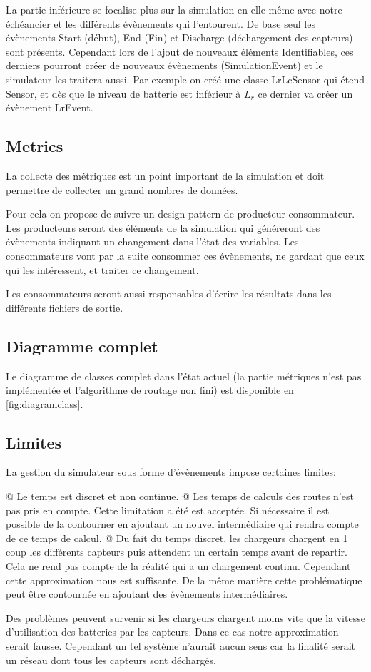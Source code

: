 \documentclass[final]{polytech/polytech}
\begin{document}
			La partie inférieure se focalise plus sur la simulation en elle même avec notre échéancier et les différents évènements qui l'entourent.
			De base seul les évènements Start (début), End (Fin) et Discharge (déchargement des capteurs) sont présents.
			Cependant lors de l'ajout de nouveaux éléments Identifiables, ces derniers pourront créer de nouveaux évènements (SimulationEvent) et le simulateur les traitera aussi.
			Par exemple on créé une classe LrLcSensor qui étend Sensor, et dès que le niveau de batterie est inférieur à $L_r$ ce dernier va créer un évènement LrEvent.
		
		\subsection{Metrics}
			La collecte des métriques est un point important de la simulation et doit permettre de collecter un grand nombres de données.
			
			Pour cela on propose de suivre un design pattern de producteur consommateur.
			Les producteurs seront des éléments de la simulation qui généreront des évènements indiquant un changement dans l'état des variables.
			Les consommateurs vont par la suite consommer ces évènements, ne gardant que ceux qui les intéressent, et traiter ce changement.
			
			Les consommateurs seront aussi responsables d'écrire les résultats dans les différents fichiers de sortie.
			
		\subsection{Diagramme complet}
			Le diagramme de classes complet dans l'état actuel (la partie métriques n'est pas implémentée et l'algorithme de routage non fini) est disponible en \autoref{fig:diagramclass}.
			
		\subsection{Limites}
			La gestion du simulateur sous forme d'évènements impose certaines limites:
			\begin{easylist}[itemize]
				@ Le temps est discret et non continue.
				@ Les temps de calculs des routes n'est pas pris en compte.
				Cette limitation a été est acceptée.
				Si nécessaire il est possible de la contourner en ajoutant un nouvel intermédiaire qui rendra compte de ce temps de calcul.
				@ Du fait du temps discret, les chargeurs chargent en 1 coup les différents capteurs puis attendent un certain temps avant de repartir.
				Cela ne rend pas compte de la réalité qui a un chargement continu.
				Cependant cette approximation nous est suffisante.
				De la même manière cette problématique peut être contournée en ajoutant des évènements intermédiaires.
				
				Des problèmes peuvent survenir si les chargeurs chargent moins vite que la vitesse d'utilisation des batteries par les capteurs.
				Dans ce cas notre approximation serait fausse.
				Cependant un tel système n'aurait aucun sens car la finalité serait un réseau dont tous les capteurs sont déchargés.
			\end{easylist}
\end{document}
